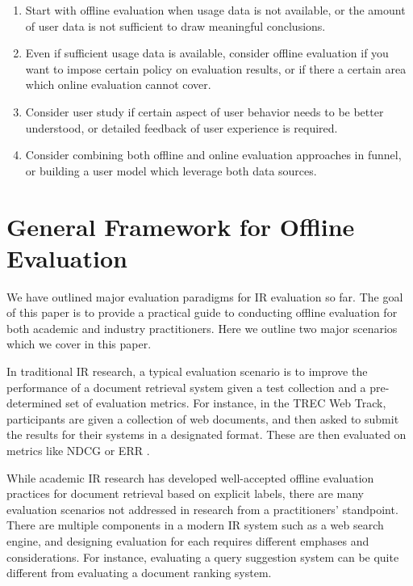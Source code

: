 \begin{enumerate}
	\item Start with offline evaluation when usage data is not available, or the amount of user data is not sufficient to draw meaningful conclusions.
	\item Even if sufficient usage data is available, consider offline evaluation if you want to impose certain policy on evaluation results, or if there a certain area which online evaluation cannot cover.
	\item Consider user study if certain aspect of user behavior needs to be better understood, or detailed feedback of user experience is required.
	\item Consider combining both offline and online evaluation approaches in funnel, or building a user model which leverage both data sources.
\end{enumerate}

\section{General Framework for Offline Evaluation}


We have outlined major evaluation paradigms for IR evaluation so far. The goal of this paper is to provide a practical guide to conducting offline evaluation for both academic and industry practitioners. Here we outline two major scenarios which we cover in this paper.

In traditional IR research, a typical evaluation scenario is to improve the performance of a document retrieval system given a test collection and a pre-determined set of evaluation metrics. For instance, in the TREC Web Track, participants are given a collection of web documents, and then asked to submit the results for their systems in a designated format. These are then evaluated on metrics like NDCG \citep{Jarvelin:2002} or ERR \citep{ChapelleMZG09}.

While academic IR research has developed well-accepted offline evaluation practices for document retrieval based on explicit labels, there are many evaluation scenarios not addressed in research from a practitioners' standpoint. There are multiple components in a modern IR system such as a web search engine, and designing evaluation for each requires different emphases and considerations. For instance, evaluating a query suggestion system can be quite different from evaluating a document ranking system. %


